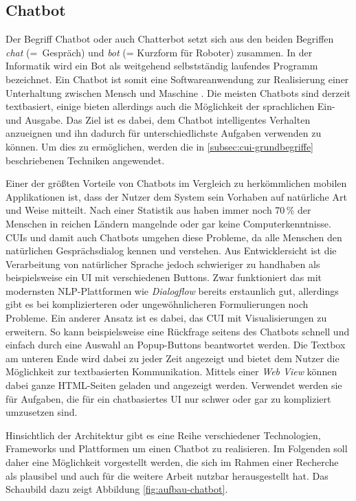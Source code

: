 \subsection{Chatbot}
\label{subsec:cui-chatbot}

Der Begriff Chatbot oder auch Chatterbot setzt sich aus den beiden Begriffen \textit{chat} \mbox{(= Gespräch)} und \textit{bot} (= Kurzform für Roboter) zusammen. In der Informatik wird ein Bot als weitgehend selbstständig laufendes Programm bezeichnet. Ein Chatbot ist somit eine Softwareanwendung zur Realisierung einer Unterhaltung zwischen Mensch und Maschine \cite[S. 232]{smolinski_innovationen_2017}. Die meisten Chatbots sind derzeit textbasiert, einige bieten allerdings auch die Möglichkeit der sprachlichen Ein- und Ausgabe. Das Ziel ist es dabei, dem Chatbot intelligentes Verhalten anzueignen und ihn dadurch für unterschiedlichste Aufgaben verwenden zu können. Um dies zu ermöglichen, werden die in \ref{subsec:cui-grundbegriffe} beschriebenen Techniken angewendet.

Einer der größten Vorteile von Chatbots im Vergleich zu herkömmlichen mobilen Applikationen ist, dass der Nutzer dem System sein Vorhaben auf natürliche Art und Weise mitteilt. Nach einer Statistik aus \cite{mcgrath_when_2018} haben immer noch 70\,\% der Menschen in reichen Ländern mangelnde oder gar keine Computerkenntnisse. \aclp{CUI} und damit auch Chatbots umgehen diese Probleme, da alle Menschen den natürlichen Gesprächsdialog kennen und verstehen. Aus Entwicklersicht ist die Verarbeitung von natürlicher Sprache jedoch schwieriger zu handhaben als beispielsweise ein \acl{UI} mit verschiedenen Buttons. Zwar funktioniert das mit modernsten \ac{NLP}-Plattformen wie \textit{Dialogflow} bereits erstaunlich gut, allerdings gibt es bei komplizierteren oder ungewöhnlicheren Formulierungen noch Probleme. Ein anderer Ansatz ist es dabei, das \acl{CUI} mit Visualisierungen zu erweitern. So kann beispielsweise eine Rückfrage seitens des Chatbots schnell und einfach durch eine Auswahl an Popup-Buttons beantwortet werden. Die Textbox am unteren Ende wird dabei zu jeder Zeit angezeigt und bietet dem Nutzer die Möglichkeit zur textbasierten Kommunikation. Mittels einer \textit{Web View} können dabei ganze \acs{HTML}-Seiten geladen und angezeigt werden. Verwendet werden sie für Aufgaben, die für ein chatbasiertes \acl{UI} nur schwer oder gar zu kompliziert umzusetzen \mbox{sind. \cite[S. 7-10]{khan_build_2018}}

Hinsichtlich der Architektur gibt es eine Reihe verschiedener Technologien, Frameworks und Plattformen um einen Chatbot zu realisieren. Im Folgenden soll daher eine Möglichkeit vorgestellt werden, die sich im Rahmen einer Recherche als plausibel und auch für die weitere Arbeit nutzbar herausgestellt hat. Das Schaubild dazu zeigt Abbildung \ref{fig:aufbau-chatbot}.

